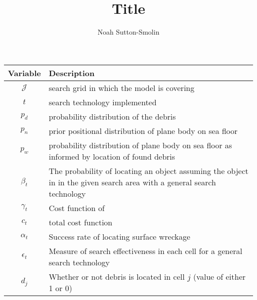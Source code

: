 \documentclass[a4paper]{article}
\title{Title}
\author{Noah Sutton-Smolin}
\begin{document}
\begin{tabular}{|c|l|}
\hline
\textbf{Variable} & \textbf{Description}\\
\hline\hline
$\mathcal{J}$ & search grid in which the model is covering \\ [1ex]
$t$ & search technology implemented \\ [1ex]
$p_d$ & probability distribution of the debris \\ [1ex]
$p_n$ & prior positional distribution of plane body on sea floor  \\ [1ex]
$p_w$ & probability distribution of plane body on sea floor as informed by location of found debris \\ [1ex]
$\beta_t$ & The probability of locating an object assuming the object in in the given search area with a general search technology \\ [1ex]
$\gamma_t$ & Cost function of \\ [1ex]
$c_t$ & total cost function \\ [1ex]
$\alpha_t$ & Success rate of locating surface wreckage \\ [1ex]
$\epsilon_t$ & Measure of search effectiveness in each cell for a general search technology \\ [1ex]
$d_j$ & Whether or not debris is located in cell $j$ (value of either 1 or 0) \\ [1ex]

\hline\hline     
\end{tabular}
\end{document}
